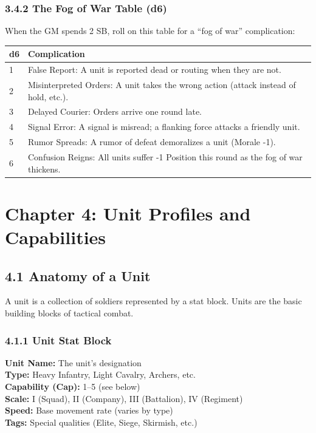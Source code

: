 \documentclass[11pt]{article}
\begin{document}
\subsubsection{3.4.2 The Fog of War Table (d6)}

When the GM spends 2 SB, roll on this table for a ``fog of war'' complication:

\begin{tabular}{|l|l|}
\hline
d6 & Complication \\
\hline
1 & False Report: A unit is reported dead or routing when they are not. \\
\hline
2 & Misinterpreted Orders: A unit takes the wrong action (attack instead of hold, etc.). \\
\hline
3 & Delayed Courier: Orders arrive one round late. \\
\hline
4 & Signal Error: A signal is misread; a flanking force attacks a friendly unit. \\
\hline
5 & Rumor Spreads: A rumor of defeat demoralizes a unit (Morale -1). \\
\hline
6 & Confusion Reigns: All units suffer -1 Position this round as the fog of war thickens. \\
\hline
\end{tabular}

\section{Chapter 4: Unit Profiles and Capabilities}

\subsection{4.1 Anatomy of a Unit}

A unit is a collection of soldiers represented by a stat block. Units are the basic building blocks of tactical combat.

\subsubsection{4.1.1 Unit Stat Block}

\textbf{Unit Name:} The unit's designation\\
\textbf{Type:} Heavy Infantry, Light Cavalry, Archers, etc.\\
\textbf{Capability (Cap):} 1–5 (see below)\\
\textbf{Scale:} I (Squad), II (Company), III (Battalion), IV (Regiment)\\
\textbf{Speed:} Base movement rate (varies by type)\\
\textbf{Tags:} Special qualities (Elite, Siege, Skirmish, etc.)\\
\end{document}
